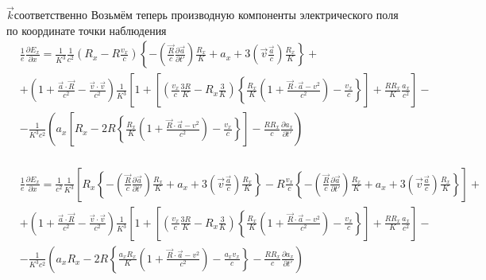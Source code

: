 \documentclass[11pt]{article}
\begin{document}
\(\overrightarrow{k}\)соответственно Возьмём теперь производную
компоненты электрического поля по координате точки наблюдения
\[\begin{align}
  & \frac{1}{e}\frac{\partial {{E}_{x}}}{\partial x}=\frac{1}{{{K}^{3}}}\frac{1}{{{c}^{2}}}\left( {{R}_{x}}-R\frac{{{v}_{x}}}{c} \right)\left\{ -\left( \frac{\overrightarrow{R}}{c}\frac{\partial \overrightarrow{a}}{\partial t'} \right)\frac{{{R}_{x}}}{K}+{{a}_{x}}+3\left( \overrightarrow{v}\frac{\overrightarrow{a}}{c} \right)\frac{{{R}_{x}}}{K} \right\}+ \\
 & +\left( 1+\frac{\overrightarrow{a}\cdot \overrightarrow{R}}{{{c}^{2}}}-\frac{\overrightarrow{v}\cdot \overrightarrow{v}}{{{c}^{2}}} \right)\frac{1}{{{K}^{3}}}\left[ 1+\left[ \left( \frac{{{v}_{x}}}{c}\frac{3R}{K}-{{R}_{x}}\frac{3}{K} \right)\left\{ \frac{{{R}_{x}}}{K}\left( 1+\frac{\overrightarrow{R}\cdot \overrightarrow{a}-{{v}^{2}}}{{{c}^{2}}} \right)-\frac{{{v}_{x}}}{c} \right\} \right]+\frac{R{{R}_{x}}}{K}\frac{{{a}_{x}}}{{{c}^{2}}} \right]- \\
 & -\frac{1}{{{K}^{3}}{{c}^{2}}}\left( {{a}_{x}}\left[ {{R}_{x}}-2R\left\{ \frac{{{R}_{x}}}{K}\left( 1+\frac{\overrightarrow{R}\cdot \overrightarrow{a}-{{v}^{2}}}{{{c}^{2}}} \right)-\frac{{{v}_{x}}}{c} \right\} \right]-\frac{R{{R}_{x}}}{c}\frac{\partial {{a}_{x}}}{\partial t'} \right) \\
\end{align}\]

\[\begin{align}
  & \frac{1}{e}\frac{\partial {{E}_{x}}}{\partial x}=\frac{1}{{{c}^{2}}}\frac{1}{{{K}^{3}}}\left[ {{R}_{x}}\left\{ -\left( \frac{\overrightarrow{R}}{c}\frac{\partial \overrightarrow{a}}{\partial t'} \right)\frac{{{R}_{x}}}{K}+{{a}_{x}}+3\left( \overrightarrow{v}\frac{\overrightarrow{a}}{c} \right)\frac{{{R}_{x}}}{K} \right\}-R\frac{{{v}_{x}}}{c}\left\{ -\left( \frac{\overrightarrow{R}}{c}\frac{\partial \overrightarrow{a}}{\partial t'} \right)\frac{{{R}_{x}}}{K}+{{a}_{x}}+3\left( \overrightarrow{v}\frac{\overrightarrow{a}}{c} \right)\frac{{{R}_{x}}}{K} \right\} \right]+ \\ 
 & +\left( 1+\frac{\overrightarrow{a}\cdot \overrightarrow{R}}{{{c}^{2}}}-\frac{\overrightarrow{v}\cdot \overrightarrow{v}}{{{c}^{2}}} \right)\frac{1}{{{K}^{3}}}\left[ 1+\left[ \left( \frac{{{v}_{x}}}{c}\frac{3R}{K}-{{R}_{x}}\frac{3}{K} \right)\left\{ \frac{{{R}_{x}}}{K}\left( 1+\frac{\overrightarrow{R}\cdot \overrightarrow{a}-{{v}^{2}}}{{{c}^{2}}} \right)-\frac{{{v}_{x}}}{c} \right\} \right]+\frac{R{{R}_{x}}}{K}\frac{{{a}_{x}}}{{{c}^{2}}} \right]- \\
 & -\frac{1}{{{K}^{3}}{{c}^{2}}}\left( {{a}_{x}}{{R}_{x}}-2R\left\{ \frac{{{a}_{x}}{{R}_{x}}}{K}\left( 1+\frac{\overrightarrow{R}\cdot \overrightarrow{a}-{{v}^{2}}}{{{c}^{2}}} \right)-\frac{{{a}_{x}}{{v}_{x}}}{c} \right\}-\frac{R{{R}_{x}}}{c}\frac{\partial {{a}_{x}}}{\partial t'} \right) \\
\end{align}\]
\end{document}
